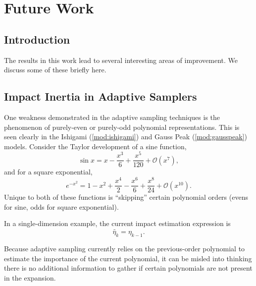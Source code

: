 
\chapter{Future Work} %

\label{Chapter9} %



\section{Introduction}
The results in this work lead to several interesting areas of improvement.  We discuss some of these briefly
here.

\section{Impact Inertia in Adaptive Samplers}
One weakness demonstrated in the adaptive sampling techniques is the phenomenon of purely-even or purely-odd
polynomial representations.  This is seen clearly in the Ishigami (\ref{mod:ishigami}) and Gauss Peak
(\ref{mod:gausspeak}) models.  Consider the Taylor development of a sine function,
\begin{equation}\label{eq:sine}
  \sin x = x - \frac{x^3}{6} + \frac{x^5}{120} + \mathcal{O}(x^7),
\end{equation}
and for a square exponential,
\begin{equation}\label{eq:sine}
  e^{-x^2} = 1 - x^2 + \frac{x^4}{2} - \frac{x^6}{6} + \frac{x^8}{24} + \mathcal{O}(x^10).
\end{equation}
Unique to both of these functions is ``skipping'' certain polynomial orders (evens for sine, odds for square
exponential).

In a single-dimension example, the current impact estimation expression is
\begin{equation}
  \tilde{\eta_k}= \eta_{k-1}.
\end{equation}

Because adaptive sampling currently relies on the previous-order polynomial to estimate the
importance of the current polynomial, it can be misled into thinking there is no additional information to
gather if certain polynomials are not present in the expansion.

